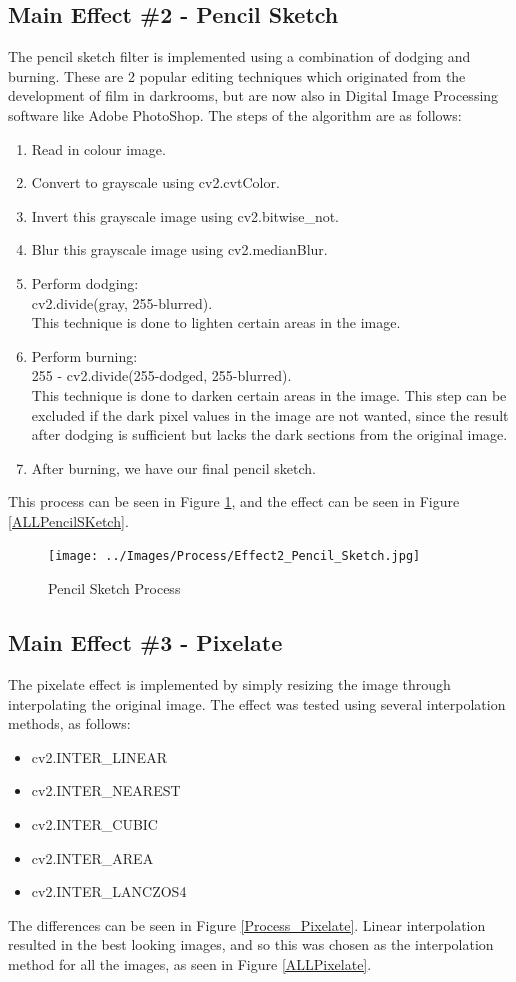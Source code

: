 \documentclass[a4paper,10pt]{report}
\begin{document}
	\subsection{Main Effect \#2 - Pencil Sketch}
	The pencil sketch filter is implemented using a combination of dodging and burning. These are 2 popular editing techniques which originated from the development of film in darkrooms, but are now also in Digital Image Processing software like Adobe PhotoShop.
	The steps of the algorithm are as follows:
	\begin{enumerate}[Step 1:]
		\item Read in colour image.
		\item Convert to grayscale using cv2.cvtColor.
		\item Invert this grayscale image using cv2.bitwise\_not.
		\item Blur this grayscale image using cv2.medianBlur.
		\item Perform dodging: \\cv2.divide(gray, 255-blurred). \\This technique is done to lighten certain areas in the image. 
		\item Perform burning: \\255 - cv2.divide(255-dodged, 255-blurred). \\This technique is done to darken certain areas in the image. This step can be excluded if the dark pixel values in the image are not wanted, since the result after dodging is sufficient but lacks the dark sections from the original image.
		\item After burning, we have our final pencil sketch.
	\end{enumerate}
	This process can be seen in Figure \ref{Process_Pencil_Sketch}, and the effect can be seen in Figure \ref{ALLPencilSKetch}.

	\begin{figure}[h]
		\caption{Pencil Sketch Process}
		\centering
		\texttt{[image: ../Images/Process/Effect2\_Pencil\_Sketch.jpg]}
		\label{Process_Pencil_Sketch}
	\end{figure}
	
	
	
	\subsection{Main Effect \#3 - Pixelate}
	The pixelate effect is implemented by simply resizing the image through interpolating the original image. The effect was tested using several interpolation methods, as follows:
	\begin{itemize}
		\item cv2.INTER\_LINEAR
		\item cv2.INTER\_NEAREST
		\item cv2.INTER\_CUBIC
		\item cv2.INTER\_AREA
		\item cv2.INTER\_LANCZOS4
	\end{itemize}
	The differences can be seen in Figure \ref{Process_Pixelate}. Linear interpolation resulted in the best looking images, and so this was chosen as the interpolation method for all the images, as seen in Figure \ref{ALLPixelate}.
	
\end{document}
